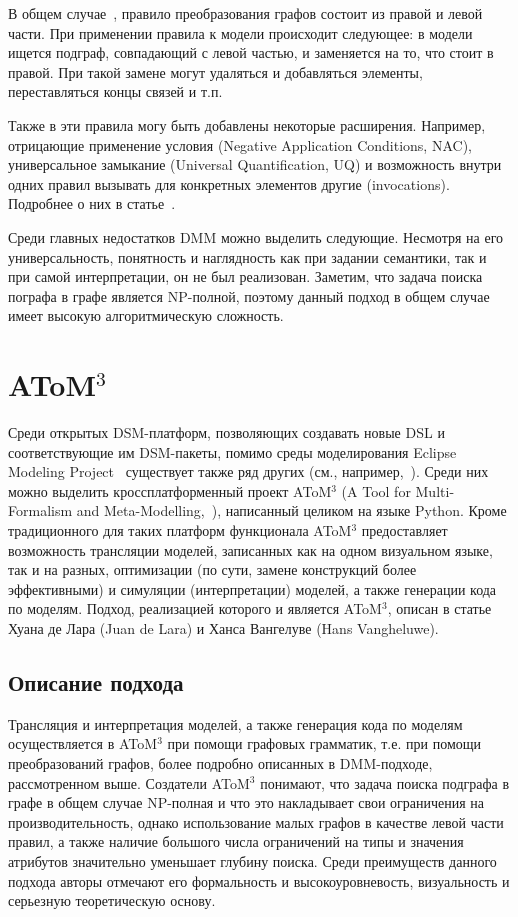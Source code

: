 \documentclass[a5paper]{article}
\begin{document}
В общем случае~\cite{graph}, правило преобразования графов состоит из правой и левой части. При применении правила к модели происходит следующее: в модели ищется подграф, совпадающий с левой частью, и заменяется на то, что стоит в правой. При такой замене могут удаляться и добавляться элементы, переставляться концы связей и т.п.

Также в эти правила могу быть добавлены некоторые расширения. Например, отрицающие применение условия (Negative Application Conditions, NAC), универсальное замыкание (Universal Quantification, UQ) и возможность внутри одних правил вызывать для конкретных элементов другие (invocations). Подробнее о них в статье~\cite{part1}.

Среди главных недостатков DMM можно выделить следующие. Несмотря на его универсальность, понятность и наглядность как при задании семантики, так и при самой интерпретации, он не был реализован. Заметим, что задача поиска пографа в графе является NP-полной, поэтому данный подход в общем случае имеет высокую алгоритмическую сложность.

\section{AToM$^3$}

Среди открытых DSM-платформ, позволяющих создавать новые DSL и соответствующие им DSM-пакеты, помимо среды моделирования Eclipse Modeling Project~\cite{koznov3} существует также ряд других (см., например,~\cite{dsm2, dsm3, dsm4}). Среди них можно выделить кроссплатформенный  проект AToM$^3$ (A Tool for Multi-Formalism and Meta-Modelling,~\cite{atom2}), написанный целиком на языке Python. Кроме традиционного для  таких платформ  функционала AToM$^3$ предоставляет возможность трансляции моделей, записанных как на одном визуальном языке, так и на разных, оптимизации (по сути, замене конструкций более эффективными) и симуляции (интерпретации) моделей, а также генерации кода по моделям. Подход,  реализацией которого и является AToM$^3$, описан в статье~\cite{atom3} Хуана де Лара (Juan de Lara) и Ханса Вангелуве (Hans Vangheluwe).

\subsection{Описание подхода}

Трансляция и интерпретация моделей, а также генерация кода по моделям осуществляется в AToM$^3$ при помощи графовых грамматик, т.е. при помощи преобразований графов, более подробно описанных в DMM-подходе, рассмотренном выше. Создатели AToM$^3$ понимают, что задача поиска подграфа в графе в общем случае NP-полная и что это накладывает свои ограничения на производительность, однако использование малых графов в качестве левой части правил, а также наличие большого числа ограничений на типы и значения атрибутов значительно уменьшает глубину поиска. Среди преимуществ данного подхода авторы отмечают его формальность и высокоуровневость, визуальность и серьезную теоретическую основу.
\end{document}
